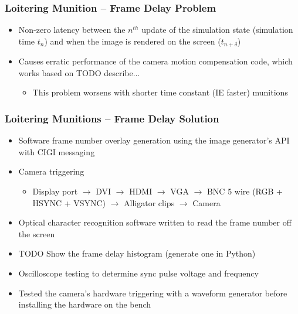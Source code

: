 \documentclass[aspectratio=169]{beamer}
\begin{document}
\begin{frame}
  \frametitle{Loitering Munition -- Frame Delay Problem}
  \begin{itemize}
  \item Non-zero latency between the $n^{th}$ update of the simulation state
    (simulation time $t_{n}$) and when the image is rendered on the
    screen ($t_{n+\delta}$)
  \item Causes erratic performance of the camera motion compensation
    code, which works based on TODO describe...
    \begin{itemize}
    \item This problem worsens with shorter time constant (IE faster)
      munitions
    \end{itemize}
  \end{itemize}
\end{frame}

\begin{frame}
  \frametitle{Loitering Munitions -- Frame Delay Solution}
  \begin{itemize}
    \item Software frame number overlay generation using the image generator's API with CIGI messaging
  \item Camera triggering
    \begin{itemize}
    \item Display port $\rightarrow$ DVI $\rightarrow$ HDMI
      $\rightarrow$ VGA $\rightarrow$ BNC 5 wire (RGB + HSYNC + VSYNC)
      $\rightarrow$ Alligator clips $\rightarrow$ Camera
    \end{itemize}
  \item Optical character recognition software written to read the
    frame number off the screen
  \item TODO Show the frame delay histogram (generate one
    in Python)
  \item Oscilloscope testing to determine sync pulse voltage and frequency
  \item Tested the camera's hardware triggering with a waveform generator
    before installing the hardware on the bench    
  \end{itemize}
\end{frame}


\end{document}
